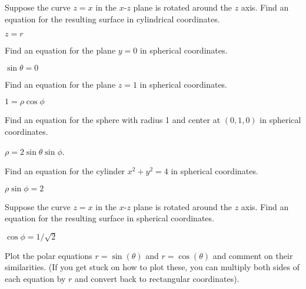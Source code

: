 \begin{enumialphparenastyle}
\begin{ex}\label{ex:rotate z=x z axis cylindrical}
Suppose the curve $z=x$ in the $x$-$z$ plane is
rotated around the $z$ axis. Find an equation for the resulting
surface in cylindrical coordinates.
\begin{sol}
	$z=r$
\end{sol}
\end{ex}

\begin{ex}
Find an equation for the plane $y=0$ in
spherical coordinates.
\begin{sol}
	$\sin\theta=0$
\end{sol}
\end{ex}

\begin{ex}
Find an equation for the plane $z=1$ in
spherical coordinates.
\begin{sol}
	$1=\rho\cos\phi$
\end{sol}
\end{ex}

\begin{ex}
Find an equation for the sphere with radius 1 and center at
$(0,1,0)$ in spherical coordinates.
\begin{sol}
	$\rho=2\sin\theta\sin\phi$.
\end{sol}
\end{ex}

\begin{ex}
Find an equation for the cylinder $x^2+y^2=4$ in
spherical coordinates.
\begin{sol}
	$\rho\sin\phi=2$
\end{sol}
\end{ex}

\begin{ex}\label{ex:rotate z=x z axis spherical}
Suppose the curve $z=x$ in the $x$-$z$ plane is
rotated around the $z$ axis. Find an equation for the resulting
surface in spherical coordinates.
\begin{sol}
	$\cos\phi=1/\sqrt2$
\end{sol}
\end{ex}

\begin{ex}
Plot the polar equations $r=\sin(\theta)$ and $r=\cos(\theta)$
and comment on their similarities.  (If you get stuck on how to plot
these, you can multiply both sides of each equation by $r$ and convert
back to rectangular coordinates).
\end{ex}


\end{enumialphparenastyle}
